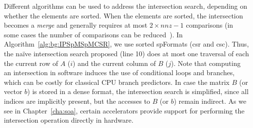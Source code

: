 Different algorithms can be used to address the \gls{intersection} search, depending on whether the elements are sorted.
When the elements are sorted, the \gls{intersection} becomes a \emph{merge} and generally requires at most $2 \times nnz - 1$ comparisons (in some cases the number of comparisons can be reduced~\cite{Baeza-Yates2010_Intersection}).
In Algorithm~\ref{alg:bg:IPSpMSpMCSR}, we use sorted \glspl{spFormat} (\acrshort{csr} and \acrshort{csc}).
Thus, the na\"ive \gls{intersection} search proposed (line 10) does at most one traversal of each the current row of $A$ ($i$) and the current column of $B$ ($j$).
Note that computing an \gls{intersection} in software induces the use of conditional loops and branches, which can be costly for classical CPU branch predictors.
In case the matrix $B$ (or vector $b$) is stored in a dense format, the \gls{intersection} search is simplified, since all indices are implicitly present, but the accesses to $B$ (or $b$) remain indirect.
As we see in Chapter~\ref{cha:soa}, certain accelerators provide support for performing the \gls{intersection} operation directly in hardware.

